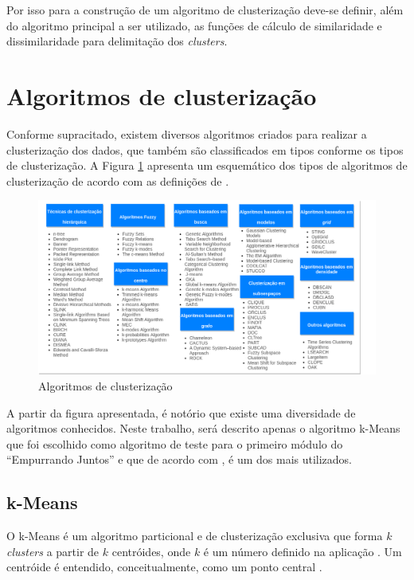 Por isso para a construção de um algoritmo de clusterização deve-se definir, além do algoritmo principal a ser utilizado, as funções
de cálculo de similaridade e dissimilaridade para delimitação dos \textit{clusters}.

\section{Algoritmos de clusterização}
Conforme supracitado, existem diversos algoritmos criados para realizar a clusterização dos dados, que também são classificados em tipos
conforme os tipos de clusterização. A Figura \ref{fig:tipos_algoritmo} apresenta um esquemático dos tipos de algoritmos de clusterização de acordo
com as definições de .

\begin{figure}[h!]
\centering
\includegraphics[scale=0.5]{figuras/algoritmos.png}
\caption{Algoritmos de clusterização}
\label{fig:tipos_algoritmo}
\end{figure}

A partir da figura apresentada, é notório que existe uma diversidade de algoritmos conhecidos. Neste trabalho, será descrito
apenas o algoritmo k-Means que foi escolhido como algoritmo de teste para o primeiro módulo do ``Empurrando Juntos'' e que de 
acordo com , é um dos mais utilizados.

\subsection{k-Means}
O k-Means é um algoritmo particional e de clusterização exclusiva que forma $k$ \textit{clusters} a partir de $k$ centróides, onde $k$ é um número definido na aplicação 
\cite{clustering_review, tan2013data}. Um centróide é entendido, conceitualmente, como um ponto central \cite{han2011data}.

